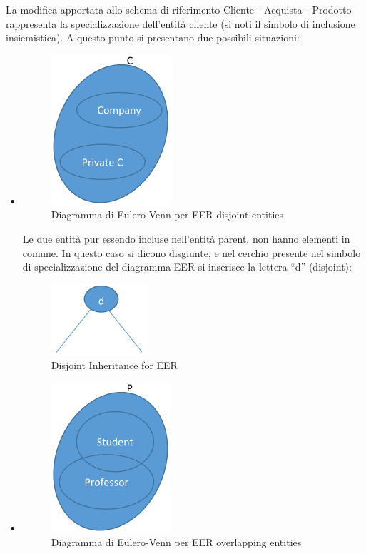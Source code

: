 La modifica apportata allo schema di riferimento Cliente - Acquista - Prodotto rappresenta la specializzazione dell’entità cliente (si noti il simbolo di inclusione insiemistica). A questo punto si presentano due possibili situazioni:

\begin{itemize}

\item

\begin{center}
\begin{figure}[H]
\centering
\includegraphics[scale=1]{figures/EERset1.png}
\caption{Diagramma di Eulero-Venn per EER disjoint entities}
\end{figure}
\end{center}

Le due entità pur essendo incluse nell’entità parent, non hanno elementi in comune. In questo caso si dicono disgiunte, e nel cerchio presente nel simbolo di specializzazione del diagramma EER si inserisce la lettera “d” (disjoint):

\begin{center}
\begin{figure}[H]
\centering
\includegraphics[scale=1]{figures/disjoint.png}
\caption{Disjoint Inheritance for EER}
\end{figure}
\end{center}

\item

\begin{center}
\begin{figure}[H]
\centering
\includegraphics[scale=1]{figures/EERset2.png}
\caption{Diagramma di Eulero-Venn per EER overlapping entities}
\end{figure}
\end{center}


\end{itemize}

